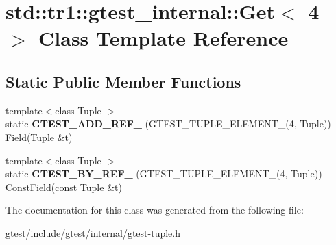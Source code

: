 \hypertarget{classstd_1_1tr1_1_1gtest__internal_1_1Get_3_014_01_4}{}\section{std\+:\+:tr1\+:\+:gtest\+\_\+internal\+:\+:Get$<$ 4 $>$ Class Template Reference}
\label{classstd_1_1tr1_1_1gtest__internal_1_1Get_3_014_01_4}
\subsection*{Static Public Member Functions}
\begin{DoxyCompactItemize}
\item 
\mbox{\label{classstd_1_1tr1_1_1gtest__internal_1_1Get_3_014_01_4_a5c7a91c681118bb7253e305f8ff42be4}} 
{\footnotesize template$<$class Tuple $>$ }\\static {\bfseries G\+T\+E\+S\+T\+\_\+\+A\+D\+D\+\_\+\+R\+E\+F\+\_\+} (G\+T\+E\+S\+T\+\_\+\+T\+U\+P\+L\+E\+\_\+\+E\+L\+E\+M\+E\+N\+T\+\_\+(4, Tuple)) Field(Tuple \&t)
\item 
\mbox{\label{classstd_1_1tr1_1_1gtest__internal_1_1Get_3_014_01_4_a04794c398bbe81e4de0915b79da2166a}} 
{\footnotesize template$<$class Tuple $>$ }\\static {\bfseries G\+T\+E\+S\+T\+\_\+\+B\+Y\+\_\+\+R\+E\+F\+\_\+} (G\+T\+E\+S\+T\+\_\+\+T\+U\+P\+L\+E\+\_\+\+E\+L\+E\+M\+E\+N\+T\+\_\+(4, Tuple)) Const\+Field(const Tuple \&t)
\end{DoxyCompactItemize}


The documentation for this class was generated from the following file\+:\begin{DoxyCompactItemize}
\item 
gtest/include/gtest/internal/gtest-\/tuple.\+h\end{DoxyCompactItemize}
